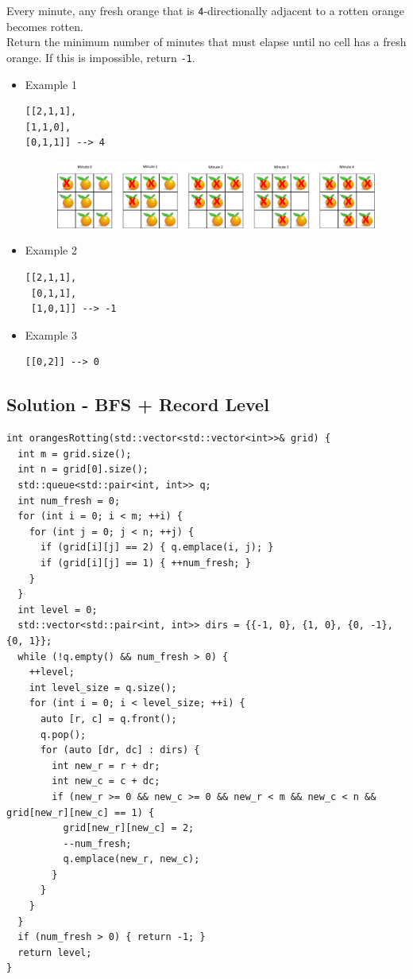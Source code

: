 Every minute, any fresh orange that is {\colorbox{CodeBackground}{\lstinline|4|}}-directionally adjacent to a rotten orange becomes rotten.\\

Return the minimum number of minutes that must elapse until no cell has a fresh orange. If this is impossible, return {\colorbox{CodeBackground}{\lstinline|-1|}}.

\begin{itemize}
\item Example 1
\begin{lstlisting}
[[2,1,1],
[1,1,0],
[0,1,1]] --> 4
\end{lstlisting}
\begin{figure}[H]
\centering
\includegraphics[width=0.8\linewidth]{images/lc0994_example}
\label{fig:lc0994example}
\end{figure}
\item Example 2
\begin{lstlisting}
[[2,1,1],
 [0,1,1],
 [1,0,1]] --> -1
\end{lstlisting}
\item Example 3
\begin{lstlisting}
[[0,2]] --> 0
\end{lstlisting}
\end{itemize}

\subsection*{Solution - BFS + Record Level}
\begin{lstlisting}
int orangesRotting(std::vector<std::vector<int>>& grid) {
  int m = grid.size();
  int n = grid[0].size();
  std::queue<std::pair<int, int>> q;
  int num_fresh = 0;
  for (int i = 0; i < m; ++i) {
    for (int j = 0; j < n; ++j) {
      if (grid[i][j] == 2) { q.emplace(i, j); }
      if (grid[i][j] == 1) { ++num_fresh; }
    }
  }
  int level = 0;
  std::vector<std::pair<int, int>> dirs = {{-1, 0}, {1, 0}, {0, -1}, {0, 1}};
  while (!q.empty() && num_fresh > 0) {
    ++level;
    int level_size = q.size();
    for (int i = 0; i < level_size; ++i) {
      auto [r, c] = q.front();
      q.pop();
      for (auto [dr, dc] : dirs) {
        int new_r = r + dr;
        int new_c = c + dc;
        if (new_r >= 0 && new_c >= 0 && new_r < m && new_c < n && grid[new_r][new_c] == 1) {
          grid[new_r][new_c] = 2;
          --num_fresh;
          q.emplace(new_r, new_c);
        }
      }
    }
  }
  if (num_fresh > 0) { return -1; }
  return level;
}
\end{lstlisting}

